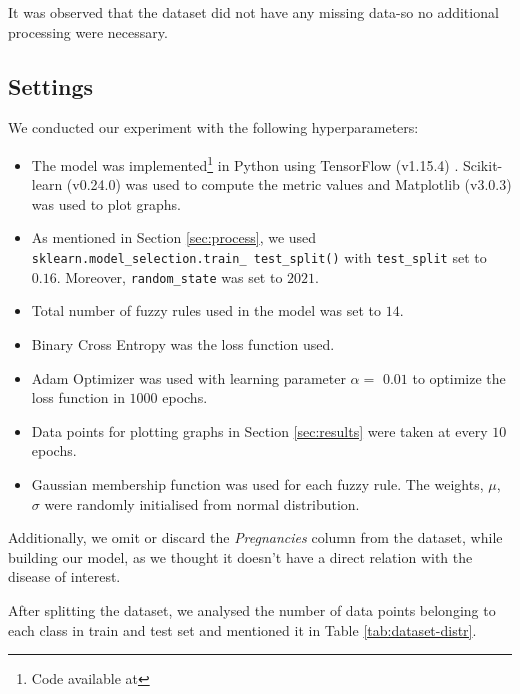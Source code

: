 \documentclass[11pt,a4paper]{article}
\begin{document}
It was observed that the dataset did not have any missing data-so no additional processing were necessary.



\subsection{Settings}

\newcommand{\varsplit}{$0.16$}
\newcommand{\varseed}{$2021$}
\newcommand{\varfuzzyrules}{$14$}
\newcommand{\varlossfn}{Binary Cross Entropy }
\newcommand{\varoptimizer}{Adam Optimizer }
\newcommand{\varalpha}{$0.01$ }
\newcommand{\varepochs}{$1000$ }
\newcommand{\varepochinterval}{$10$ }
\newcommand{\varmf}{Gaussian }

We conducted our experiment with the following hyperparameters:
\begin{itemize}
    \item The model was implemented\footnote{Code available at \vargithubrepo} in Python using TensorFlow (v1.15.4) \cite{tensorflow}. Scikit-learn (v0.24.0) \cite{scikit-learn} was used to compute the metric values and Matplotlib (v3.0.3) \cite{matplotlib} was used to plot graphs.
    \item As mentioned in Section \ref{sec:process}, we used \texttt{ sklearn.model\_selection.train\_ test\_split()} with \texttt{test\_split} set to \varsplit. Moreover, \texttt{random\_state} was set to \varseed.
    \item Total number of fuzzy rules used in the model was set to \varfuzzyrules.
    \item \varlossfn was the loss function used.
    \item \varoptimizer was used with learning parameter $\alpha =$ \varalpha to optimize the loss function in \varepochs epochs.
    \item Data points for plotting graphs in Section \ref{sec:results} were taken at every \varepochinterval epochs.
    \item \varmf membership function was used for each fuzzy rule. The weights, $\mu$, $\sigma$ were randomly initialised from normal distribution.
    
\end{itemize}

Additionally, we omit or discard the \textit{Pregnancies} column from the dataset, while building our model, as we thought it doesn't have a direct relation with the disease of interest.

After splitting the dataset, we analysed the number of data points belonging to each class in train and test set and mentioned it in Table \ref{tab:dataset-distr}.
\end{document}
